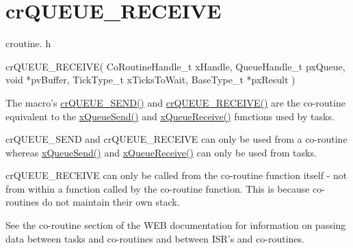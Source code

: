 \hypertarget{group__crQUEUE__RECEIVE}{\section{cr\-Q\-U\-E\-U\-E\-\_\-\-R\-E\-C\-E\-I\-V\-E}
\label{group__crQUEUE__RECEIVE}
}
croutine. h 
\begin{DoxyPre}
  crQUEUE\_RECEIVE(
                     CoRoutineHandle\_t xHandle,
                     QueueHandle\_t pxQueue,
                     void *pvBuffer,
                     TickType\_t xTicksToWait,
                     BaseType\_t *pxResult
                 )\end{DoxyPre}


The macro's \hyperlink{croutine_8h_a26af3d36f22a04168eebdf5b08465d6e}{cr\-Q\-U\-E\-U\-E\-\_\-\-S\-E\-N\-D()} and \hyperlink{croutine_8h_a586d57fd9a3e2aa5ae66484ed3be36c9}{cr\-Q\-U\-E\-U\-E\-\_\-\-R\-E\-C\-E\-I\-V\-E()} are the co-\/routine equivalent to the \hyperlink{queue_8h_af7eb49d3249351176992950d9185abe9}{x\-Queue\-Send()} and \hyperlink{queue_8h_af1549eac0e7f05694a59a0b967c80be3}{x\-Queue\-Receive()} functions used by tasks.

cr\-Q\-U\-E\-U\-E\-\_\-\-S\-E\-N\-D and cr\-Q\-U\-E\-U\-E\-\_\-\-R\-E\-C\-E\-I\-V\-E can only be used from a co-\/routine whereas \hyperlink{queue_8h_af7eb49d3249351176992950d9185abe9}{x\-Queue\-Send()} and \hyperlink{queue_8h_af1549eac0e7f05694a59a0b967c80be3}{x\-Queue\-Receive()} can only be used from tasks.

cr\-Q\-U\-E\-U\-E\-\_\-\-R\-E\-C\-E\-I\-V\-E can only be called from the co-\/routine function itself -\/ not from within a function called by the co-\/routine function. This is because co-\/routines do not maintain their own stack.

See the co-\/routine section of the W\-E\-B documentation for information on passing data between tasks and co-\/routines and between I\-S\-R's and co-\/routines.


